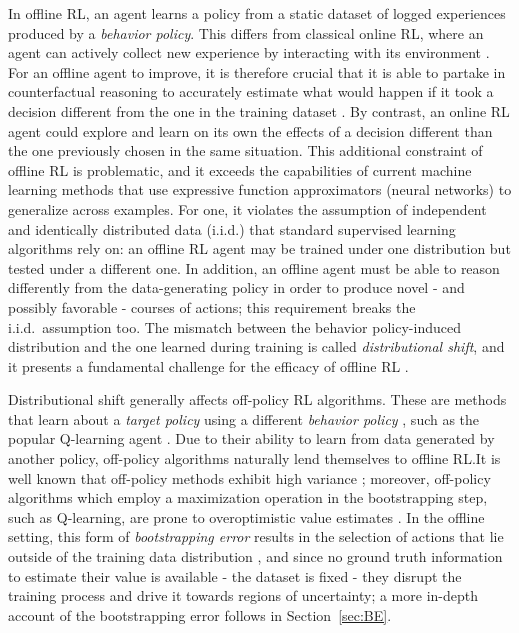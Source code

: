In offline RL, an agent learns a policy from a static dataset of
logged experiences produced by a \textit{behavior policy}.
This differs from classical online RL, where an agent can actively
collect new experience by interacting with its environment
\citep{sutton2018reinforcement}. For an offline agent to
improve, it is therefore crucial that it is able to partake in
counterfactual
reasoning to accurately estimate what would happen if it took a
decision different from the one in the training dataset
\citep{levine2020offline}. By contrast, an online RL agent could
explore and learn on its own the effects of a decision
different than the one previously chosen in the same situation. This
additional constraint of offline RL is
problematic, and it exceeds the capabilities of current machine learning
methods that use expressive function approximators (neural networks)
to generalize across examples. For one, it violates the assumption of
independent and
identically distributed data (i.i.d.) that standard supervised
learning algorithms rely on: an offline RL agent may be trained under
one distribution but tested under a different one.
In addition, an offline agent must be able to reason differently from
the data-generating policy in order to produce novel - and possibly
favorable - courses of actions; this requirement breaks the i.i.d.\
assumption too.
The mismatch between the behavior policy-induced distribution and the
one learned during training is called \textit{distributional shift},
and it presents a fundamental challenge for the efficacy of offline RL
\citep{levine2020offline}.

Distributional shift generally affects off-policy RL algorithms. These
are methods that learn about a \textit{target policy} using a
different \textit{behavior policy} \citep{sutton2018reinforcement},
such as the popular Q-learning agent \citep{watkins1992q}. Due to
their ability to learn from data generated by another policy,
off-policy algorithms naturally lend themselves to offline RL.\@ It is
well known that off-policy methods exhibit high variance
\citep{sutton2018reinforcement}; moreover,
off-policy algorithms which employ a maximization operation in the
bootstrapping step, such as Q-learning,
are prone to overoptimistic value estimates
\citep{thrun1993issues}. In the offline setting, this form of
\textit{bootstrapping error} results in the selection of actions that
lie outside of the training data distribution
\citep{kumar2019stabilizing}, and since no ground truth information to
estimate their value is available - the dataset is fixed - they
disrupt the training process and drive it towards regions of
uncertainty; a more in-depth account of the bootstrapping error
follows in Section~\ref{sec:BE}.

